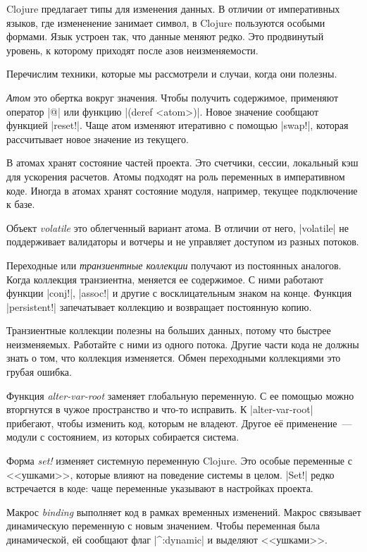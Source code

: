 Clojure предлагает типы для изменения данных. В отличии от императивных языков,
где измененение занимает символ, в Clojure пользуются особыми формами. Язык
устроен так, что данные меняют редко. Это продвинутый уровень, к которому
приходят после азов неизменяемости.

Перечислим техники, которые мы рассмотрели и случаи, когда они полезны.

\emph{Атом} это обертка вокруг значения. Чтобы получить содержимое, применяют
оператор \spverb|@| или функцию \spverb|(deref <atom>)|. Новое значение сообщают
функцией \spverb|reset!|. Чаще атом изменяют итеративно с помощью
\spverb|swap!|, которая рассчитывает новое значение из текущего.

В атомах хранят состояние частей проекта. Это счетчики, сессии, локальный кэш
для ускорения расчетов. Атомы подходят на роль переменных в императивном
коде. Иногда в атомах хранят состояние модуля, например, текущее подключение к
базе.

Объект \emph{volatile} это облегченный вариант атома. В отличии от него,
\spverb|volatile| не поддерживает валидаторы и вотчеры и не управляет доступом
из разных потоков.

Переходные или \emph{транзиентные коллекции} получают из постоянных
аналогов. Когда коллекция транзиентна, меняется ее содержимое. С ними работают
функции \spverb|conj!|, \spverb|assoc!| и другие с восклицательным знаком на
конце. Функция \spverb|persistent!| запечатывает коллекцию и возвращает
постоянную копию.

Транзиентные коллекции полезны на больших данных, потому что быстрее
неизменяемых. Работайте с ними из одного потока. Другие части кода не должны
знать о том, что коллекция изменяется. Обмен переходными коллекциями это грубая
ошибка.

Функция \emph{alter-var-root} заменяет глобальную переменную. С ее помощью можно
вторгнутся в чужое пространство и что-то исправить. К \spverb|alter-var-root|
прибегают, чтобы изменить код, которым не владеют. Другое е\"{е} применение~---
модули с состоянием, из которых собирается система.

Форма \emph{set!} изменяет системную переменную Clojure. Это особые переменные с
<<ушками>>, которые влияют на поведение системы в целом. \spverb|Set!| редко
встречается в коде: чаще переменные указывают в настройках проекта.

Макрос \emph{binding} выполняет код в рамках временных изменений. Макрос
связывает динамическую переменную с новым значением. Чтобы переменная была
динамической, ей сообщают флаг \spverb|^:dynamic| и выделяют <<ушками>>.

